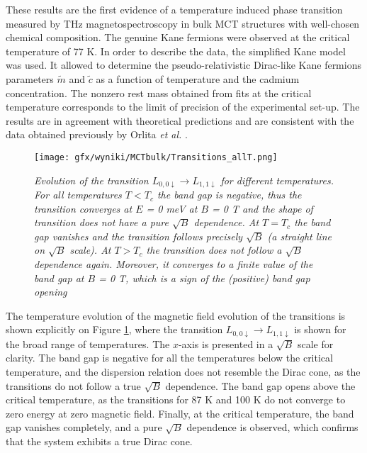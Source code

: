 \documentclass[titlepage,a4paper]{book}
\begin{document}
These results are the first evidence of a temperature induced phase transition measured by THz magnetospectroscopy in bulk MCT structures with well-chosen chemical composition. The genuine Kane fermions were observed at the critical temperature of 77 K. In order to describe the data, the simplified Kane model was used. It allowed to determine the pseudo-relativistic Dirac-like Kane fermions parameters $\tilde{m}$ and $\tilde{c}$ as a function of temperature and the cadmium concentration. The nonzero rest mass obtained from fits at the critical temperature corresponds to the limit of precision of the experimental set-up. The results are in agreement with theoretical predictions and are consistent with the data obtained previously by Orlita \textit{et al.} \cite{Orlita_MCT}.

\begin{figure}[ht]
	\centering
	\texttt{[image: gfx/wyniki/MCTbulk/Transitions\_allT.png]}
	\vspace{-10pt}
	\caption{\textit{Evolution of the transition $L_{0,0\downarrow} \rightarrow L_{1,1\downarrow}$ for different temperatures. For all temperatures $T < T_c$ the band gap is negative, thus the transition converges at $E$ = 0 meV at $B$ = 0 T and the shape of transition does not have a pure $\sqrt{B}$ dependence. At $T = T_c$ the band gap vanishes and the transition follows precisely $\sqrt{B}$ (a straight line on $\sqrt{B}$ scale). At $T > T_c$ the transition does not follow a $\sqrt{B}$ dependence again. Moreover, it converges to a finite value of the band gap at $B$ = 0 T, which is a sign of the (positive) band gap opening}}
	\label{fig:Bulk_Transitions_allT}
\end{figure}
The temperature evolution of the magnetic field evolution of the transitions is shown explicitly on Figure \ref{fig:Bulk_Transitions_allT}, where the transition $L_{0,0\downarrow} \rightarrow L_{1,1\downarrow}$ is shown for the broad range of temperatures. The $x$-axis is presented in a $\sqrt{B}$ scale for clarity. The band gap is negative for all the temperatures below the critical temperature, and the dispersion relation does not resemble the Dirac cone, as the transitions do not follow a true $\sqrt{B}$ dependence. The band gap opens above the critical temperature, as the transitions for 87 K and 100 K do not converge to zero energy at zero magnetic field. Finally, at the critical temperature, the band gap vanishes completely, and a pure $\sqrt{B}$ dependence is observed, which confirms that the system exhibits a true Dirac cone.
\end{document}
